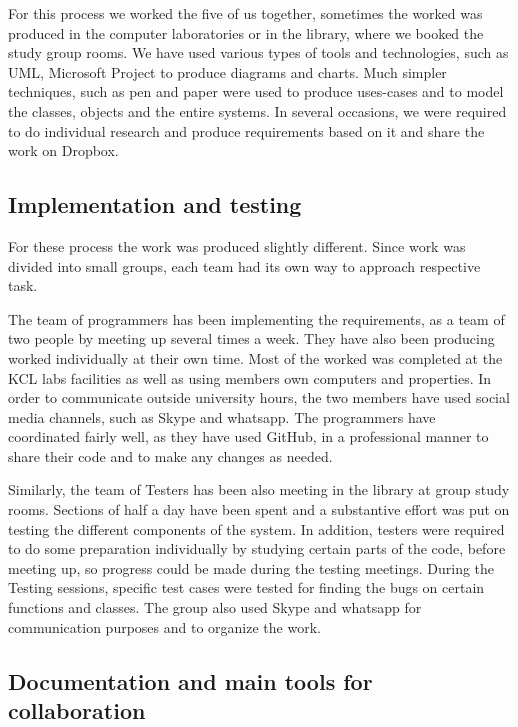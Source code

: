 For this process we worked the five of us together, sometimes the worked was produced in the computer laboratories or in the library, where we booked the study group rooms. We have used various types of tools and technologies, such as UML, Microsoft Project to produce diagrams and charts. Much simpler techniques, such as pen and paper were used to produce uses-cases and to model the classes, objects and the entire systems. In several occasions, we were required to do individual research and produce requirements based on it and share the work on Dropbox.

\subsection{Implementation and testing} 
For these process the work was produced slightly different. Since work was divided into small groups, each team had its own way to approach respective task. \newline

The team of programmers has been implementing the requirements, as a team of two people by meeting up several times a week. They have also been producing worked individually at their own time. Most of the worked was completed at the KCL labs facilities as well as using members own computers and properties. In order to communicate outside university hours, the two members have used social media channels, such as Skype and whatsapp. The programmers have coordinated fairly well, as they have used GitHub, in a professional manner to share their code and to make any changes as needed. \newline

Similarly, the team of Testers has been also meeting in the library at group study rooms. Sections of half a day have been spent and a substantive effort was put on testing the different components of the system. In addition, testers were required to do some preparation individually by studying certain parts of the code, before meeting up, so progress could be made during the testing meetings. During the Testing sessions, specific test cases were tested for finding the bugs on certain functions and classes. The group also used Skype and whatsapp for communication purposes and to organize the work. 

\subsection{Documentation and main tools for collaboration} 

